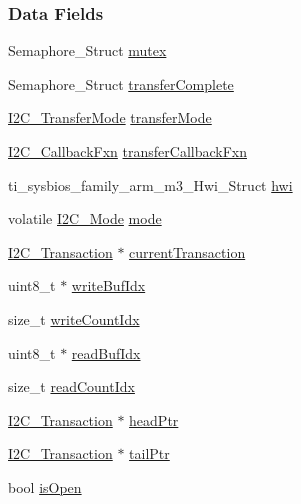 \subsubsection*{Data Fields}
\begin{DoxyCompactItemize}
\item 
Semaphore\-\_\-\-Struct \hyperlink{struct_i2_c_tiva___object_ab5732612f8d726766ac03090cef2f464}{mutex}
\item 
Semaphore\-\_\-\-Struct \hyperlink{struct_i2_c_tiva___object_a04447b4f959b4882af33b78e3b05bce3}{transfer\-Complete}
\item 
\hyperlink{_i2_c_8h_a39f3b9340fc4ee241b0d2da9b2841c26}{I2\-C\-\_\-\-Transfer\-Mode} \hyperlink{struct_i2_c_tiva___object_a04f864a6f1bb4d4561fa14b3606a4012}{transfer\-Mode}
\item 
\hyperlink{_i2_c_8h_a5ece918abf136397f682df3924441634}{I2\-C\-\_\-\-Callback\-Fxn} \hyperlink{struct_i2_c_tiva___object_a5b74f5516b0c46a6a16c8e5df9de619d}{transfer\-Callback\-Fxn}
\item 
ti\-\_\-sysbios\-\_\-family\-\_\-arm\-\_\-m3\-\_\-\-Hwi\-\_\-\-Struct \hyperlink{struct_i2_c_tiva___object_a942b0ffaf1a7a7bfea05eeeb9ac08244}{hwi}
\item 
volatile \hyperlink{_i2_c_8h_ac8f0941a68f18f5d1743a21ab32c7929}{I2\-C\-\_\-\-Mode} \hyperlink{struct_i2_c_tiva___object_ad053bb3053241d9a2b9b474bfa1bce8b}{mode}
\item 
\hyperlink{struct_i2_c___transaction}{I2\-C\-\_\-\-Transaction} $\ast$ \hyperlink{struct_i2_c_tiva___object_aed736876ed3cf26c69bbf7b61d450042}{current\-Transaction}
\item 
uint8\-\_\-t $\ast$ \hyperlink{struct_i2_c_tiva___object_a6e14179dcc38177ade3c5bef4404f1bb}{write\-Buf\-Idx}
\item 
size\-\_\-t \hyperlink{struct_i2_c_tiva___object_a0c98fe0fcb52da4ea29516402aae56b8}{write\-Count\-Idx}
\item 
uint8\-\_\-t $\ast$ \hyperlink{struct_i2_c_tiva___object_a6df9e5e6f703e9b23bc325bc70a3ac2a}{read\-Buf\-Idx}
\item 
size\-\_\-t \hyperlink{struct_i2_c_tiva___object_ad3b3a075a971c85b4e2a00665d208866}{read\-Count\-Idx}
\item 
\hyperlink{struct_i2_c___transaction}{I2\-C\-\_\-\-Transaction} $\ast$ \hyperlink{struct_i2_c_tiva___object_ab004ef4879f8e53ef8cfcec4c5589cdb}{head\-Ptr}
\item 
\hyperlink{struct_i2_c___transaction}{I2\-C\-\_\-\-Transaction} $\ast$ \hyperlink{struct_i2_c_tiva___object_af9dbef087eec693dd7dd41822b52b8bd}{tail\-Ptr}
\item 
bool \hyperlink{struct_i2_c_tiva___object_a8026898ec8dd40f92c6a1acdbc599832}{is\-Open}
\end{DoxyCompactItemize}


